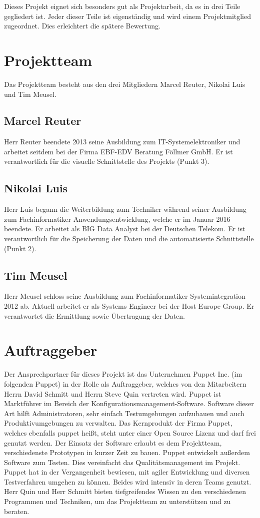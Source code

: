 Dieses Projekt eignet sich besonders gut als Projektarbeit, da es in drei Teile
gegliedert ist. Jeder dieser Teile ist eigenständig und wird einem
Projektmitglied zugeordnet. Dies erleichtert die spätere Bewertung.
\all%

\section{Projektteam}
Das Projektteam besteht aus den drei Mitgliedern Marcel Reuter, Nikolai Luis
und Tim Meusel.
\all%

\subsection{Marcel Reuter}
Herr Reuter beendete 2013 seine Ausbildung zum IT-Systemelektroniker und
arbeitet seitdem bei der Firma EBF-EDV Beratung Föllmer GmbH. Er ist
verantwortlich für die visuelle Schnittstelle des Projekts (Punkt 3).
\mr%

\subsection{Nikolai Luis}
Herr Luis begann die Weiterbildung zum Techniker während seiner Ausbildung zum
Fachinformatiker Anwendungsentwicklung, welche er im Januar 2016 beendete. Er
arbeitet als BIG Data Analyst bei der Deutschen Telekom. Er ist verantwortlich
für die Speicherung der Daten und die automatisierte Schnittstelle (Punkt 2).
\nl%

\subsection{Tim Meusel}
Herr Meusel schloss seine Ausbildung zum Fachinformatiker Systemintegration
2012 ab. Aktuell arbeitet er als Systems Engineer bei der Host Europe Group.
Er verantwortet die Ermittlung sowie Übertragung der Daten.
\tm%

\section{Auftraggeber}
Der Ansprechpartner für dieses Projekt ist das Unternehmen Puppet Inc. (im
folgenden Puppet) in der Rolle als Auftraggeber, welches von den Mitarbeitern
Herrn David Schmitt und Herrn Steve Quin vertreten wird. Puppet ist Marktführer
im Bereich der Konfigurationsmanagement-Software. Software dieser Art hilft
Administratoren, sehr einfach Testumgebungen aufzubauen und auch
Produktivumgebungen zu verwalten. Das Kernprodukt der Firma Puppet, welches
ebenfalls puppet heißt, steht unter einer Open Source Lizenz und darf frei
genutzt werden. Der Einsatz der Software erlaubt es dem Projektteam,
verschiedenste Prototypen in kurzer Zeit zu bauen. Puppet entwickelt außerdem
Software zum Testen. Dies vereinfacht das Qualitätsmanagement im Projekt.
Puppet hat in der Vergangenheit bewiesen, mit agiler Entwicklung und diversen
Testverfahren umgehen zu können. Beides wird intensiv in deren Teams genutzt.
Herr Quin und Herr Schmitt bieten tiefgreifendes Wissen zu den verschiedenen
Programmen und Techniken, um das Projektteam zu unterstützen und zu beraten.
\all%

